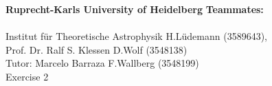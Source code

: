 \documentclass[a4paper, 11pt]{article}
\begin{document}
\large\textbf{Ruprecht-Karls University of Heidelberg} \hfill \textbf{Teammates:} \\\\
\normalsize Institut für Theoretische Astrophysik \hfill 
H.Lüdemann (3589643),  \\
Prof. Dr. Ralf S. Klessen \hfill  D.Wolf (3548138) \\
Tutor: Marcelo Barraza \hfill F.Wallberg (3548199)\\
Exercise 2 \\




\end{document}
